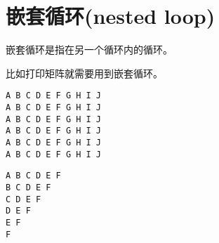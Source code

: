 \section{嵌套循环(nested loop)}
\begin{frame}[fragile]\ft{\secname}
嵌套循环是指在另一个循环内的循环。\vspace{.1in}

比如打印矩阵就需要用到嵌套循环。
\end{frame}

\begin{frame}\ft{\secname}


\end{frame}

\begin{frame}[fragile]\ft{\secname}
 \begin{lstlisting}[backgroundcolor=\color{red!10}]
A B C D E F G H I J 
A B C D E F G H I J 
A B C D E F G H I J 
A B C D E F G H I J 
A B C D E F G H I J 
A B C D E F G H I J 
\end{lstlisting}
\end{frame}

\begin{frame}\ft{\secname}


\end{frame}

\begin{frame}[fragile]\ft{\secname}
 \begin{lstlisting}
A B C D E F 
B C D E F 
C D E F 
D E F 
E F 
F 
\end{lstlisting}
\end{frame}
